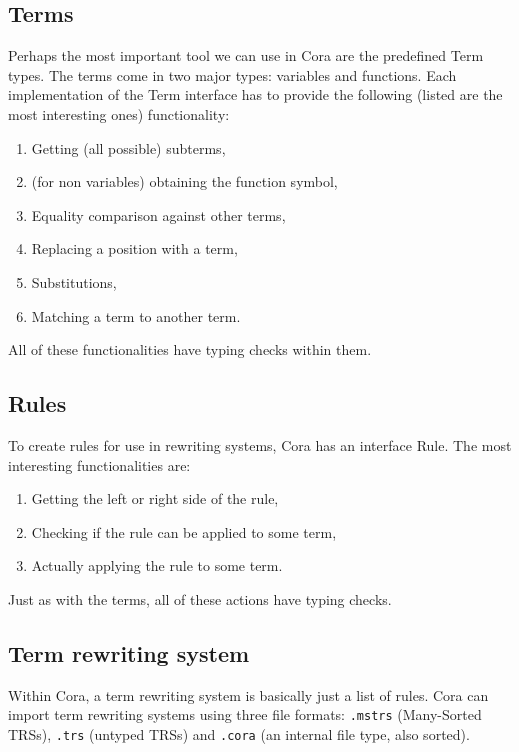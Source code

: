 \subsection{Terms}
Perhaps the most important tool we can use in Cora are the predefined Term types. The terms come in two major types: variables and functions. Each implementation of the Term interface has to provide the following (listed are the most interesting ones) functionality: 
\begin{enumerate}
    \itemsep0em 
    \item Getting (all possible) subterms,
    \item (for non variables) obtaining the function symbol,
    \item Equality comparison against other terms,
    \item Replacing a position with a term,
    \item Substitutions,
    \item Matching a term to another term.
\end{enumerate}
All of these functionalities have typing checks within them. 
\subsection{Rules}
To create rules for use in rewriting systems, Cora has an interface Rule. The most interesting functionalities are: 
\begin{enumerate}
    \itemsep0em
    \item Getting the left or right side of the rule,
    \item Checking if the rule can be applied to some term,
    \item Actually applying the rule to some term.
\end{enumerate}
Just as with the terms, all of these actions have typing checks. 
\subsection{Term rewriting system}
Within Cora, a term rewriting system is basically just a list of rules. Cora can import term rewriting systems using three file formats: \texttt{.mstrs} (Many-Sorted TRSs), \texttt{.trs} (untyped TRSs) and \texttt{.cora} (an internal file type, also sorted). 